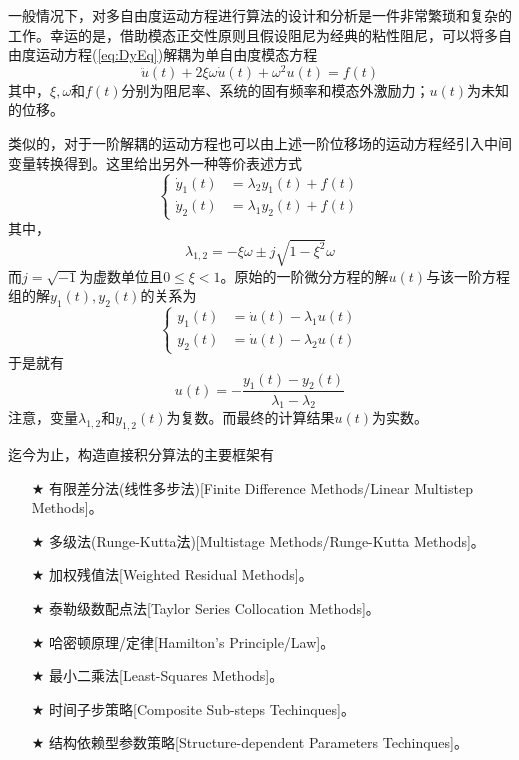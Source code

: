 一般情况下，对多自由度运动方程进行算法的设计和分析是一件非常繁琐和复杂的工作。幸运的是，借助模态正交性原则\cite{Hughes2000c}且假设阻尼为经典的粘性阻尼，可以将多自由度运动方程(\ref{eq:DyEq})解耦为单自由度模态方程
\begin{equation}
\ddot{u}(t)+2\xi\omega\dot{u}(t)+\omega^2u(t)=f(t)
\end{equation}
其中，$\xi,\omega$和$f(t)$分别为阻尼率、系统的固有频率和模态外激励力；$u(t)$为未知的位移。

类似的，对于一阶解耦的运动方程也可以由上述一阶位移场的运动方程经引入中间变量转换得到。这里给出另外一种等价表述方式\cite{Fung1996g,Fung1996e}
\begin{equation}
\left\{
\begin{aligned}
\dot{y}_1(t)&=\lambda_2y_1(t)+f(t)\\
\dot{y}_2(t)&=\lambda_1y_2(t)+f(t)
\end{aligned}\right.
\end{equation}
其中，
\begin{equation}
\lambda_{1,2}=-\xi\omega\pm j\sqrt{1-\xi^2}\omega
\end{equation}
而$j=\sqrt{-1}$为虚数单位且$0\le\xi<1$。原始的一阶微分方程的解$u(t)$与该一阶方程组的解$y_1(t),y_2(t)$的关系为
\begin{equation}
\left\{
\begin{aligned}
y_1(t)&=\dot{u}(t)-\lambda_1u(t)\\
y_2(t)&=\dot{u}(t)-\lambda_2u(t)
\end{aligned}
\right.
\end{equation}
于是就有
\begin{equation}
u(t)=-\frac{y_1(t)-y_2(t)}{\lambda_1-\lambda_2}
\end{equation}
注意，变量$\lambda_{1,2}$和$y_{1,2}(t)$为复数。而最终的计算结果$u(t)$为实数。

迄今为止，构造直接积分算法的主要框架有
\begin{itemize}
\item[$\bigstar$] 有限差分法(线性多步法)[Finite Difference Methods/Linear Multistep Methods]。
\item[$\bigstar$] 多级法(Runge-Kutta法)[Multistage Methods/Runge-Kutta Methods]。
\item[$\bigstar$] 加权残值法[Weighted Residual Methods]。
\item[$\bigstar$] 泰勒级数配点法[Taylor Series Collocation Methods]。
\item[$\bigstar$] 哈密顿原理/定律[Hamilton's Principle/Law]。
\item[$\bigstar$] 最小二乘法[Least-Squares Methods]。
\item[$\bigstar$] 时间子步策略[Composite Sub-steps Techinques]。
\item[$\bigstar$] 结构依赖型参数策略[Structure-dependent Parameters Techinques]。
\end{itemize}

